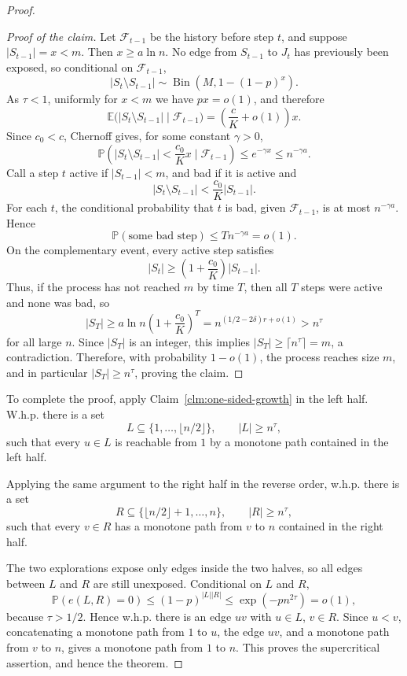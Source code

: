 \documentclass[10pt,a4paper]{amsart}
\newcommand{\EE}{\mathbb{E}}
\newcommand{\PP}{\mathbb{P}}
\begin{document}
\begin{proof}
\begin{proof}[Proof of the claim]
Let \(\mathcal F_{t-1}\) be the history before step \(t\), and suppose
\(|S_{t-1}|=x<m\). Then \(x\ge a\ln n\). No edge from \(S_{t-1}\) to \(J_t\)
has previously been exposed, so conditional on \(\mathcal F_{t-1}\),
\[
    |S_t\setminus S_{t-1}|
    \sim \operatorname{Bin}\left(M,1-(1-p)^x\right).
\]
As \(\tau<1\), uniformly for \(x<m\) we have \(px=o(1)\), and therefore
\[
    \EE\bigl(|S_t\setminus S_{t-1}|\mid \mathcal F_{t-1}\bigr)
    =\left(\frac{c}{K}+o(1)\right)x .
\]
Since \(c_0<c\), Chernoff gives, for some constant \(\gamma>0\),
\[
    \PP\left(|S_t\setminus S_{t-1}|<\frac{c_0}{K}x
    \mid \mathcal F_{t-1}\right)
    \le e^{-\gamma x}
    \le n^{-\gamma a}.
\]
Call a step \(t\) active if \(|S_{t-1}|<m\), and bad if it is active and
\[
    |S_t\setminus S_{t-1}|<\frac{c_0}{K}|S_{t-1}|.
\]
For each \(t\), the conditional probability that \(t\) is bad, given
\(\mathcal F_{t-1}\), is at most \(n^{-\gamma a}\). Hence
\[
    \PP(\text{some bad step})\le Tn^{-\gamma a}=o(1).
\]
On the complementary event, every active step satisfies
\[
    |S_t|\ge \left(1+\frac{c_0}{K}\right)|S_{t-1}|.
\]
Thus, if the process has not reached \(m\) by time \(T\), then all \(T\) steps
were active and none was bad, so
\[
    |S_T|
    \ge a\ln n\left(1+\frac{c_0}{K}\right)^T
    =n^{(1/2-2\delta)r+o(1)}
    > n^\tau
\]
for all large \(n\). Since \(|S_T|\) is an integer, this implies
\(|S_T|\ge \lceil n^\tau\rceil=m\), a contradiction. Therefore, with
probability \(1-o(1)\), the process reaches size \(m\), and in particular
\(|S_T|\ge n^\tau\), proving the claim.
\end{proof}

\noindent To complete the proof, apply Claim~\ref{clm:one-sided-growth} in the left
half. W.h.p. there is a set
\[
    L\subseteq \{1,\ldots,\lfloor n/2\rfloor\},
    \qquad |L|\ge n^\tau,
\]
such that every \(u\in L\) is reachable from \(1\) by a monotone path contained
in the left half.

Applying the same argument to the right half in the reverse order, w.h.p.
there is a set
\[
    R\subseteq \{\lfloor n/2\rfloor+1,\ldots,n\},
    \qquad |R|\ge n^\tau,
\]
such that every \(v\in R\) has a monotone path from \(v\) to \(n\) contained in
the right half.

The two explorations expose only edges inside the two halves, so all edges
between \(L\) and \(R\) are still unexposed. Conditional on \(L\) and \(R\),
\[
    \PP(e(L,R)=0)
    \le (1-p)^{|L||R|}
    \le \exp(-p n^{2\tau})
    =o(1),
\]
because \(\tau>1/2\). Hence w.h.p. there is an edge \(uv\) with
\(u\in L\), \(v\in R\). Since \(u<v\), concatenating a monotone path from
\(1\) to \(u\), the edge \(uv\), and a monotone path from \(v\) to \(n\), gives
a monotone path from \(1\) to \(n\). This proves the supercritical assertion,
and hence the theorem.
\end{proof}
\end{document}
